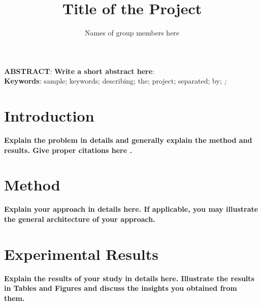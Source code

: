 \documentclass[12pt]{article}
\begin{document}
\title{Title of the Project}

\author{Names of group members here}

\maketitle


\noindent \textbf{ABSTRACT}: \textbf{Write a short abstract here}: \lipsum[1-1]
~\\ 
\textbf{Keywords}: sample; keywords; describing; the; project; separated; by; \textit{;}

\section{Introduction}\label{S:1}
\textbf{Explain the problem in details and generally explain the method and results. Give proper citations here \cite{Smith:2013jd}.} \lipsum[1-6]


\section{Method}\label{S:2}
\textbf{Explain your approach in details here. If applicable, you may illustrate the general architecture of your approach.} \lipsum[1-7]


\section{Experimental Results}\label{S:2}
\textbf{Explain the results of your study in details here. Illustrate the results in Tables and Figures and discuss the insights you obtained from them.} \lipsum[1-9]




\end{document}
